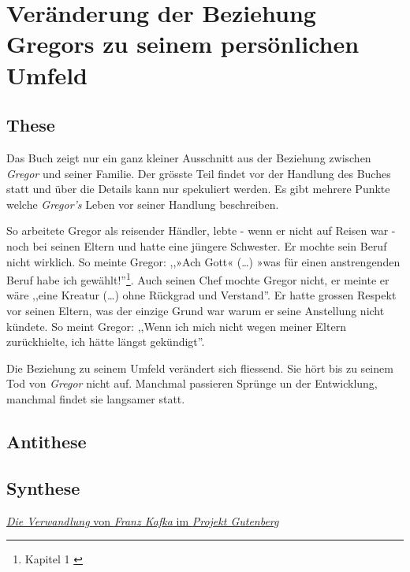 \documentclass[12pt,a4paper,twoside,titlepage]{article}
\begin{document}
	
	
	\section{Veränderung der Beziehung Gregors zu seinem persönlichen Umfeld}
	
	\subsection{These}
	
	Das Buch zeigt nur ein ganz kleiner Ausschnitt aus der Beziehung zwischen \textit{Gregor} und seiner Familie. Der grösste Teil findet vor der Handlung des Buches statt und über die Details kann nur spekuliert werden. Es gibt mehrere Punkte welche \textit{Gregor's} Leben vor seiner Handlung beschreiben.
	
	So arbeitete Gregor als reisender Händler, lebte - wenn er nicht auf Reisen war - noch bei seinen Eltern und hatte eine jüngere Schwester. Er mochte sein Beruf nicht wirklich. So meinte Gregor: ,,»Ach Gott« (\dots) »was für einen anstrengenden Beruf habe ich gewählt!''\footnote{Kapitel 1 \cite{verwandlung} \label{k1}}. Auch seinen Chef mochte Gregor nicht, er meinte er wäre ,,eine Kreatur (\dots) ohne Rückgrad und Verstand''. Er hatte grossen Respekt vor seinen Eltern, was der einzige Grund war warum er seine Anstellung nicht kündete. So meint Gregor: ,,Wenn ich mich nicht wegen meiner Eltern zurückhielte, ich hätte längst gekündigt''.
	
	
	Die Beziehung zu seinem Umfeld verändert sich fliessend. Sie hört bis zu seinem Tod von \textit{Gregor} nicht auf. Manchmal passieren Sprünge un der Entwicklung, manchmal findet sie langsamer statt. 	
	
	
	
	\subsection{Antithese}
	
	\subsection{Synthese}
	
	
	
	\begin{thebibliography}{9}
		 \href{http://gutenberg.spiegel.de/buch/die-verwandlung-165/1}{\textit{Die Verwandlung} von \textit{Franz Kafka} im \textit{Projekt Gutenberg}}
			
	\end{thebibliography}
	
	
	
	
\end{document}
